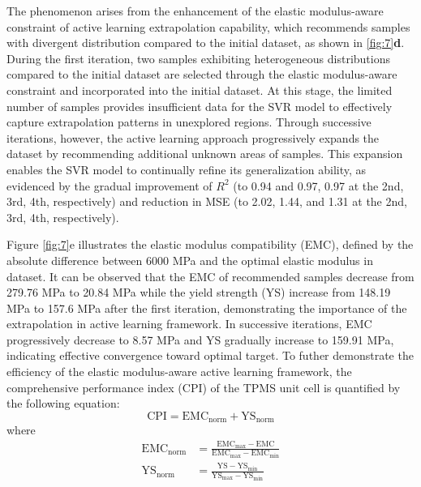 \documentclass[preprint,review,12pt,authoryear]{elsarticle}
\begin{document}
The phenomenon arises from the enhancement of the elastic modulus-aware constraint of active learning extrapolation capability, which recommends samples with divergent distribution compared to the initial dataset, as shown in \ref{fig:7}\textbf{d}. During the first iteration, two samples exhibiting heterogeneous distributions compared to the initial dataset are selected through the elastic modulus-aware constraint and incorporated into the initial dataset. At this stage, the limited number of samples provides insufficient data for the SVR model to effectively capture extrapolation patterns in unexplored regions. Through successive iterations, however, the active learning approach progressively expands the dataset by recommending additional unknown areas of samples. This expansion enables the SVR model to continually refine its generalization ability, as evidenced by the gradual improvement of $R^2$ (to 0.94 and 0.97, 0.97 at the 2nd, 3rd, 4th, respectively) and reduction in MSE (to 2.02, 1.44, and 1.31 at the 2nd, 3rd, 4th, respectively).

Figure \ref{fig:7}e illustrates the elastic modulus compatibility (EMC), defined by the absolute difference between 6000 MPa and the optimal elastic modulus in dataset. It can be observed that the EMC of recommended samples decrease from 279.76 MPa to 20.84 MPa while the yield strength (YS) increase from 148.19 MPa to 157.6 MPa after the first iteration, demonstrating the importance of the extrapolation in active learning framework.  In successive iterations, EMC progressively decrease to 8.57 MPa and YS gradually increase to 159.91 MPa, indicating effective convergence toward optimal target. To futher demonstrate the efficiency of the elastic modulus-aware active learning framework, the comprehensive performance index (CPI) of the TPMS unit cell is quantified by the following equation:
\begin{equation}
    \text{CPI} = \text{EMC}_\text{norm}+\text{YS}_\text{norm}
\end{equation}
where
\begin{equation}
    \begin{aligned}
        \text{EMC}_\text{norm} &= \frac{\text{EMC}_\text{max} - \text{EMC}}{\text{EMC}_\text{max} - \text{EMC}_\text{min}}\\
        \text{YS}_\text{norm}&= \frac{\text{YS}-\text{YS}_\text{min}}{\text{YS}_\text{max} - \text{YS}_\text{min}}\\
    \end{aligned}
\end{equation}
\end{document}
